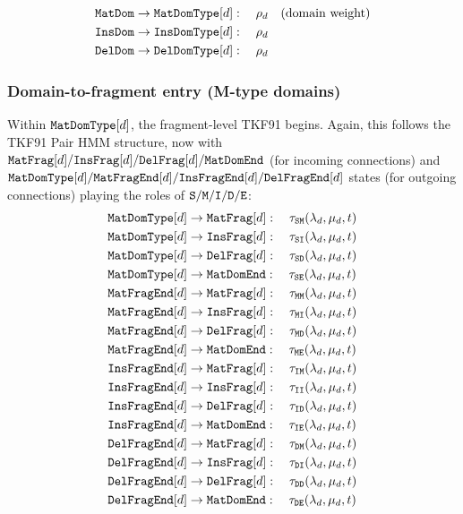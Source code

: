 \documentclass{article}
\begin{document}
\begin{align}
\mathtt{MatDom} &\to \mathtt{MatDomType}[d]: \quad \rho_d \quad\text{(domain weight)} \\
\mathtt{InsDom} &\to \mathtt{InsDomType}[d]: \quad \rho_d \\
\mathtt{DelDom} &\to \mathtt{DelDomType}[d]: \quad \rho_d
\end{align}

\subsubsection{Domain-to-fragment entry (M-type domains)}

Within $\mathtt{MatDomType}[d]$, the fragment-level TKF91 begins.
Again, this follows the TKF91 Pair HMM structure, now with $\mathtt{MatFrag}[d]/\mathtt{InsFrag}[d]/\mathtt{DelFrag}[d]/\mathtt{MatDomEnd}$ (for incoming connections) and $\mathtt{MatDomType}[d]/\mathtt{MatFragEnd}[d]/\mathtt{InsFragEnd}[d]/\mathtt{DelFragEnd}[d]$ states (for outgoing connections)
playing the roles of ${\tt S}/{\tt M}/{\tt I}/{\tt D}/{\tt E}$:
\begin{align}
\mathtt{MatDomType}[d] &\to \mathtt{MatFrag}[d]: \quad \tau_{{\tt S}{\tt M}}(\lambda_d,\mu_d,t) \\
\mathtt{MatDomType}[d] &\to \mathtt{InsFrag}[d]: \quad \tau_{{\tt S}{\tt I}}(\lambda_d,\mu_d,t) \\
\mathtt{MatDomType}[d] &\to \mathtt{DelFrag}[d]: \quad \tau_{{\tt S}{\tt D}}(\lambda_d,\mu_d,t) \\
\mathtt{MatDomType}[d] &\to \mathtt{MatDomEnd}: \quad \tau_{{\tt S}{\tt E}}(\lambda_d,\mu_d,t) \\
\mathtt{MatFragEnd}[d] &\to \mathtt{MatFrag}[d]: \quad \tau_{{\tt M}{\tt M}}(\lambda_d,\mu_d,t) \\
\mathtt{MatFragEnd}[d] &\to \mathtt{InsFrag}[d]: \quad \tau_{{\tt M}{\tt I}}(\lambda_d,\mu_d,t) \\
\mathtt{MatFragEnd}[d] &\to \mathtt{DelFrag}[d]: \quad \tau_{{\tt M}{\tt D}}(\lambda_d,\mu_d,t) \\
\mathtt{MatFragEnd}[d] &\to \mathtt{MatDomEnd}: \quad \tau_{{\tt M}{\tt E}}(\lambda_d,\mu_d,t) \\
\mathtt{InsFragEnd}[d] &\to \mathtt{MatFrag}[d]: \quad \tau_{{\tt I}{\tt M}}(\lambda_d,\mu_d,t) \\
\mathtt{InsFragEnd}[d] &\to \mathtt{InsFrag}[d]: \quad \tau_{{\tt I}{\tt I}}(\lambda_d,\mu_d,t) \\
\mathtt{InsFragEnd}[d] &\to \mathtt{DelFrag}[d]: \quad \tau_{{\tt I}{\tt D}}(\lambda_d,\mu_d,t) \\
\mathtt{InsFragEnd}[d] &\to \mathtt{MatDomEnd}: \quad \tau_{{\tt I}{\tt E}}(\lambda_d,\mu_d,t) \\
\mathtt{DelFragEnd}[d] &\to \mathtt{MatFrag}[d]: \quad \tau_{{\tt D}{\tt M}}(\lambda_d,\mu_d,t) \\
\mathtt{DelFragEnd}[d] &\to \mathtt{InsFrag}[d]: \quad \tau_{{\tt D}{\tt I}}(\lambda_d,\mu_d,t) \\
\mathtt{DelFragEnd}[d] &\to \mathtt{DelFrag}[d]: \quad \tau_{{\tt D}{\tt D}}(\lambda_d,\mu_d,t) \\
\mathtt{DelFragEnd}[d] &\to \mathtt{MatDomEnd}: \quad \tau_{{\tt D}{\tt E}}(\lambda_d,\mu_d,t)
\end{align}
\end{document}
